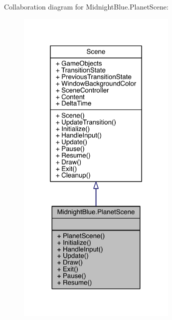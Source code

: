 Collaboration diagram for Midnight\+Blue.\+Planet\+Scene\+:
\nopagebreak
\begin{figure}[H]
\begin{center}
\leavevmode
\includegraphics[width=217pt]{class_midnight_blue_1_1_planet_scene__coll__graph}
\end{center}
\end{figure}
